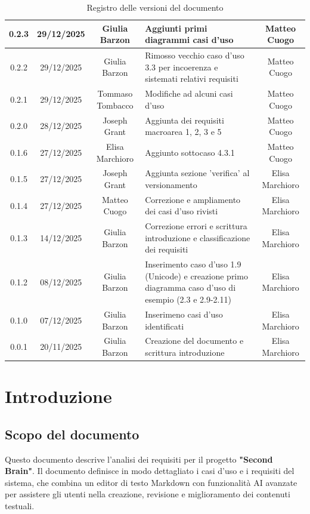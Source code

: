 \documentclass[11pt,a4paper]{article}
\begin{document}
\begin{table}[H]
\begin{tabular}{|c|c|c|>{\raggedright\arraybackslash}p{}|c|}
        \hline
        0.2.3 & 29/12/2025 & Giulia Barzon & Aggiunti primi diagrammi casi d'uso &  Matteo Cuogo \\
        \hline
        0.2.2 & 29/12/2025 & Giulia Barzon & Rimosso vecchio caso d'uso 3.3 per incoerenza e sistemati relativi requisiti & Matteo Cuogo \\
        \hline
        0.2.1 & 29/12/2025 & Tommaso Tombacco & Modifiche ad alcuni casi d'uso &  Matteo Cuogo\\ 
        \hline
        0.2.0 & 28/12/2025 & Joseph Grant & Aggiunta dei requisiti macroarea 1, 2, 3 e 5 &  Matteo Cuogo\\ 
        \hline
        0.1.6 & 27/12/2025 & Elisa Marchioro & Aggiunto sottocaso 4.3.1 & Matteo Cuogo\\ 
        \hline
        0.1.5 & 27/12/2025 & Joseph Grant & Aggiunta sezione 'verifica' al versionamento & Elisa Marchioro\\ 
        \hline
        0.1.4 & 27/12/2025 & Matteo Cuogo & Correzione e ampliamento dei casi d'uso rivisti & Elisa Marchioro\\
        \hline
        0.1.3 & 14/12/2025 & Giulia Barzon & Correzione errori e scrittura introduzione e classificazione dei requisiti & Elisa Marchioro\\
        \hline
        0.1.2 & 08/12/2025 & Giulia Barzon & Inserimento caso d'uso 1.9 (Unicode) e creazione primo diagramma caso d'uso di esempio (2.3 e 2.9-2.11) & Elisa Marchioro\\
        \hline
        0.1.0 & 07/12/2025 & Giulia Barzon & Inserimeno casi d'uso identificati & Elisa Marchioro\\
        \hline
        0.0.1 & 20/11/2025 & Giulia Barzon & Creazione del documento e scrittura introduzione & Elisa Marchioro\\
        \hline
    \end{tabular}
    \caption{Registro delle versioni del documento}
    \label{tab:versionamento}
\end{table}

\newpage

\tableofcontents
\thispagestyle{empty}
\newpage

\setcounter{page}{1}

\section{Introduzione}
\subsection{Scopo del documento}
Questo documento descrive l'analisi dei requisiti per il progetto \textbf{"Second Brain"}. Il documento definisce in modo dettagliato i casi d'uso e i requisiti del sistema, che combina un editor di testo Markdown con funzionalità AI avanzate per assistere gli utenti nella creazione, revisione e miglioramento dei contenuti testuali.
\end{document}
